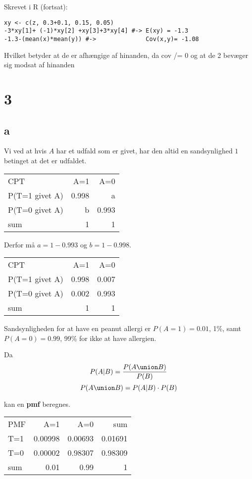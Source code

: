 \documentclass[11pt]{article}
\begin{document}
Skrevet i R (fortsat):
\begin{verbatim}
xy <- c(z, 0.3+0.1, 0.15, 0.05)
-3*xy[1]+ (-1)*xy[2] +xy[3]+3*xy[4] #-> E(xy) = -1.3
-1.3-(mean(x)*mean(y)) #->              Cov(x,y)= -1.08
\end{verbatim}

Hvilket betyder at de er afhængige af hinanden, da cov /= 0 og at de 2 bevæger sig modsat af hinanden

\section{3}
\label{sec:org68ff1a6}
\subsection{a}
\label{sec:org2c4f44c}
Vi ved at hvis \(A\) har et udfald som er givet,
har den altid en sandsynlighed \(1\) betinget at det er udfaldet.

\begin{center}
\begin{tabular}{lrr}
CPT & A=1 & A=0\\
P(T=1 givet A) & 0.998 & a\\
P(T=0 givet A) & b & 0.993\\
sum & 1 & 1\\
\end{tabular}
\end{center}

Derfor må \(a = 1-0.993\) og \(b=1-0.998\).

\begin{center}
\begin{tabular}{lrr}
CPT & A=1 & A=0\\
P(T=1 givet A) & 0.998 & 0.007\\
P(T=0 givet A) & 0.002 & 0.993\\
sum & 1 & 1\\
\end{tabular}
\end{center}

Sandsynligheden for at have en peanut allergi er \(P(A = 1) = 0.01\), 1\%,
samt \(P(A = 0) = 0.99\), 99\% for ikke at have allergien.

Da
\[P(A|B) = \frac{P(A \union B)}{P(B)}\]
\[P(A \union B) = P(A|B)\cdot P(B)\]

kan en \textbf{pmf} beregnes.

\begin{center}
\begin{tabular}{lrrr}
PMF & A=1 & A=0 & sum\\
T=1 & 0.00998 & 0.00693 & 0.01691\\
T=0 & 0.00002 & 0.98307 & 0.98309\\
sum & 0.01 & 0.99 & 1\\
\end{tabular}
\end{center}
\end{document}
